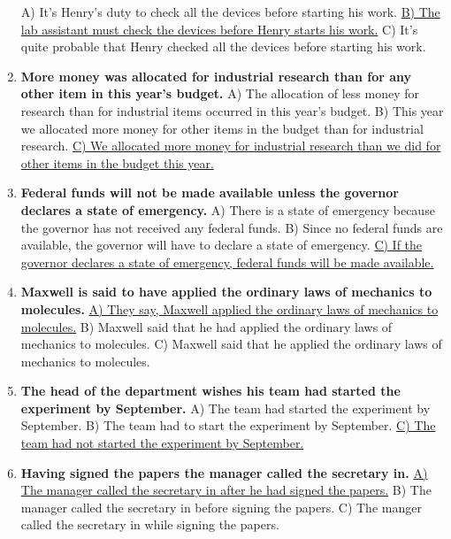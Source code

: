 \documentclass[main.tex]{subfiles}
\begin{document}
\begin{enumerate}[nosep, leftmargin=*]
		A) It's Henry's duty to check all the devices before starting his work.\newline
		\uline{B) The lab assistant must check the devices before Henry starts his work.}\newline
		C) It's quite probable that Henry checked all the devices before starting his work.
	\item \textbf{More money was allocated for industrial research than for any other item in this year's budget.}\newline
		A) The allocation of less money for research than for industrial items occurred in this year's budget.\newline
		B) This year we allocated more money for other items in the budget than for industrial research.\newline
		\uline{C) We allocated more money for industrial research than we did for other items in the budget this year.}
	\item \textbf{Federal funds will not be made available unless the governor declares a state of emergency.}\newline
		A) There is a state of emergency because the governor has not received any federal funds.\newline
		B) Since no federal funds are available, the governor will have to declare a state of emergency.\newline
		\uline{C) If the governor declares a state of emergency, federal funds will be made available.}
	\item \textbf{Maxwell is said to have applied the ordinary laws of mechanics to molecules.}\newline
		\uline{A) They say, Maxwell applied the ordinary laws of mechanics to molecules.}\newline
		B) Maxwell said that he had applied the ordinary laws of mechanics to molecules.\newline
		C) Maxwell said that he applied the ordinary laws of mechanics to molecules.
	\item \textbf{The head of the department wishes his team had started the experiment by September.}\newline
		A) The team had started the experiment by September.\newline
		B) The team had to start the experiment by September.\newline
		\uline{C) The team had not started the experiment by September.}
	\item \textbf{Having signed the papers the manager called the secretary in.}\newline
		\uline{A) The manager called the secretary in after he had signed the papers.}\newline
		B) The manager called the secretary in before signing the papers.\newline
		C) The manger called the secretary in while signing the papers.
\end{enumerate}
\ 
\end{document}
